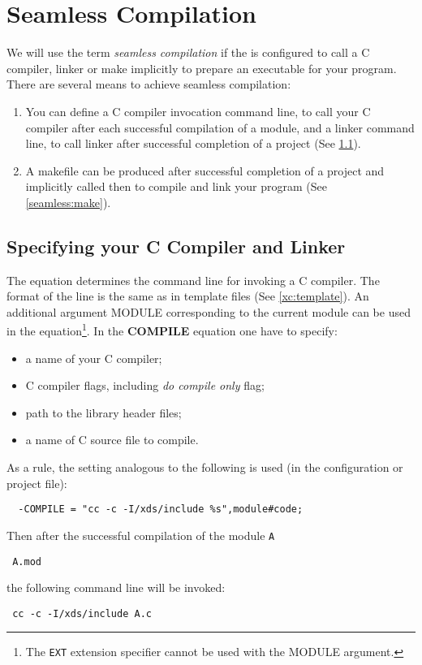 \chapter{Seamless Compilation}\label{seamless}

We will use the term {\em seamless compilation} if the \xds{}
is configured to call a C compiler, linker or make implicitly
to prepare an executable for your program.
There are several means to achieve seamless compilation:
\begin{enumerate}
\item
        You can define a C compiler invocation command line,
        to call your C compiler after each successful compilation
        of a module, and
        a linker command line, to call linker after successful
        completion of a project (See \ref{seamless:comp}).
\item
        A makefile can be produced after successful completion
        of a project and implicitly called then to compile
        and link your program (See \ref{seamless:make}).
\end{enumerate}

\section{Specifying your C Compiler and Linker}\label{seamless:comp}

The 
equation determines the command line for
invoking a C compiler. The format of the line is the same as in
template files (See \ref{xc:template}).
An additional argument  MODULE  corresponding to the current module
can be used in the equation\footnote{
  The {\tt EXT} extension specifier cannot be used with the MODULE
  argument.
}.
In the {\bf COMPILE} equation one have to specify:
\begin{itemize}
\item   a name of your C compiler;
\item   C compiler flags, including {\em do compile only} flag;
\item   path to the library header files;
\item   a name of C source file to compile.
\end{itemize}

As a rule, the setting analogous to the following is used
(in the configuration or project file):
\begin{verbatim}
  -COMPILE = "cc -c -I/xds/include %s",module#code;
\end{verbatim}
Then after the successful compilation of the module {\tt A}
\begin{flushleft} \tt
        \XC{} A.mod
\end{flushleft}
the following command line will be invoked:
\begin{flushleft} \tt
cc -c -I/xds/include A.c
\end{flushleft}

